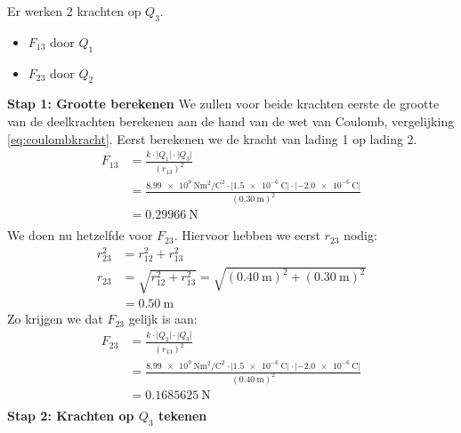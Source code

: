 \begin{opl}
Er werken 2 krachten op $Q_{3}$. 
\begin{itemize}
\item $F_{13}$ door $Q_{1}$  
\item $F_{23}$ door $Q_{2}$  
\end{itemize}
\textbf{Stap 1: Grootte berekenen} 
We zullen voor beide krachten eerste de grootte van de deelkrachten berekenen aan de hand van de wet van Coulomb, vergelijking \ref{eq:coulombkracht}. Eerst berekenen we de kracht van lading 1 op lading 2.
	\begin{align*}
		F_{13}&=\frac{k\cdot\lvert Q_{1}\rvert\cdot\lvert Q_{3}\rvert}{(r_{13})^{2}}		\tag*{wet van Coulomb}\\
		&=\frac{\qty{8,99e9}{\newton\meter\squared\per\coulomb\squared} \cdot\lvert\qty{+1,5e-6}{\coulomb} \rvert \cdot\lvert \qty{-2,0e-6}{\coulomb}\rvert}{(\qty{0,30}{\meter})^{2}}		\tag*{gegevens invullen}\\
			&=\qty{0,29966}{\newton}	\tag*{uitrekenen}\\
	\end{align*}
We doen nu hetzelfde voor $F_{23}$. Hiervoor hebben we eerst $r_{23}$ nodig:
\begin{align*}
	r_{23}^{2}	&=r_{12}^{2}+r_{13}^{2}	\tag*{wet van Pythagoras}\\
	r_{23}	&=\sqrt{r_{12}^{2}+r_{13}^{2}}=\sqrt{(\qty{0,40}{\meter})^{2}+(\qty{0,30}{\meter})^{2}}\\
			&=\qty{0,50}{\meter}
\end{align*}
Zo krijgen we dat $F_{23}$ gelijk is aan:
	\begin{align*}
		F_{23}&=\frac{k\cdot\lvert Q_{2}\rvert\cdot\lvert Q_{3}\rvert}{(r_{13})^{2}}		\tag*{wet van Coulomb}\\
		&=\frac{\qty{8,99e9}{\newton\meter\squared\per\coulomb\squared} \cdot\lvert\qty{+1,5e-6}{\coulomb} \rvert \cdot\lvert \qty{-2,0e-6}{\coulomb}\rvert}{(\qty{0,40}{\meter})^{2}}		\tag*{gegevens invullen}\\
		&=\qty{0,1685625}{\newton}	\tag*{uitrekenen}\\
	\end{align*}
\textbf{Stap 2: Krachten op $Q_{3}$ tekenen}  


\end{opl}
